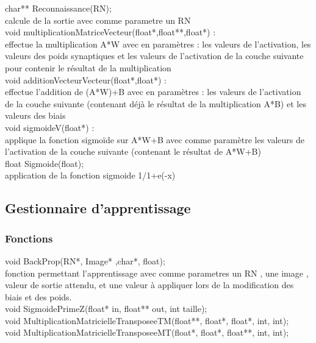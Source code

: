 \documentclass{article}
\begin{document}
			char** Reconnaissance(RN);\\
				calcule de la sortie avec comme parametre un RN\\
				
			void multiplicationMatriceVecteur(float*,float**,float*) :\\
				effectue la multiplication A*W avec en paramètres : les valeurs de l'activation, les valeurs des poids synaptiques et les valeurs de l'activation de la couche suivante pour contenir le résultat de la multiplication\\
				
			void additionVecteurVecteur(float*,float*) :\\
				effectue l'addition de (A*W)+B avec en paramètres : les valeurs de l'activation de la couche suivante (contenant déjà le résultat de la multiplication A*B) et les valeurs des biais\\
				
			void sigmoideV(float*) :\\
				applique la fonction sigmoïde sur A*W+B avec comme paramètre les valeurs de l'activation de la couche suivante (contenant le résultat de  A*W+B)\\
				
			float Sigmoide(float);\\
			    application de la fonction sigmoide 1/1+e(-x)\\
			    
	\subsection{Gestionnaire d'apprentissage}
	     \subsubsection{Fonctions}
			void BackProp(RN*, Image* ,char*, float);\\
				fonction permettant l'apprentissage avec comme parametres un RN , une image , valeur de sortie attendu, et une valeur à appliquer lors de la modification des biais et des poids.\\
				
			void SigmoidePrimeZ(float* in, float** out, int taille);\\
				
			void MultiplicationMatricielleTransposeeTM(float**, float*, float*, int, int);\\ 
			
			void MultiplicationMatricielleTransposeeMT(float*, float*, float**, int, int);\\
			
\end{document}
